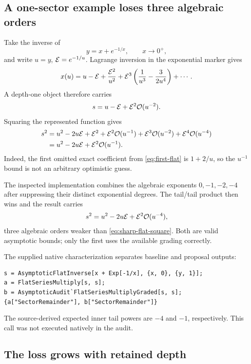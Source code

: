 \subsection{A one-sector example loses three algebraic orders}

Take the inverse of
\[
 y=x+e^{-1/x},\qquad x\to0^+,
\]
and write $u=y$, $\mathcal{E}=e^{-1/u}$. Lagrange inversion in the exponential marker gives
\begin{equation}\label{eq:first-flat}
 x(u)=u-\mathcal{E}+\frac{\mathcal{E}^2}{u^2}
       +\mathcal{E}^3\left(\frac1{u^3}-\frac{3}{2u^4}\right)+\cdots.
\end{equation}
A depth-one object therefore carries
\begin{equation}
 s=u-\mathcal{E}+\mathcal{E}^2\mathcal{O}(u^{-2}).
\end{equation}
Squaring the represented function gives
\begin{align}
 s^2={}&u^2-2u\mathcal{E}+\mathcal{E}^2
     +\mathcal{E}^2\mathcal{O}(u^{-1})
     +\mathcal{E}^3\mathcal{O}(u^{-2})
     +\mathcal{E}^4\mathcal{O}(u^{-4})\\
   ={}&u^2-2u\mathcal{E}+\mathcal{E}^2\mathcal{O}(u^{-1}).\label{eq:sharp-flat-square}
\end{align}
Indeed, the first omitted exact coefficient from \eqref{eq:first-flat} is $1+2/u$, so the $u^{-1}$ bound is not an arbitrary optimistic guess.

The inspected implementation combines the algebraic exponents $0,-1,-2,-4$ after suppressing their distinct exponential degrees. The tail/tail product then wins and the result carries
\begin{equation}\label{eq:weak-flat-square}
 s^2=u^2-2u\mathcal{E}+\mathcal{E}^2\mathcal{O}(u^{-4}),
\end{equation}
three algebraic orders weaker than \eqref{eq:sharp-flat-square}. Both are valid asymptotic bounds; only the first uses the available grading correctly.

The supplied native characterization separates baseline and proposal outputs:
\begin{lstlisting}
s = AsymptoticFlatInverse[x + Exp[-1/x], {x, 0}, {y, 1}];
a = FlatSeriesMultiply[s, s];
b = AsymptoticAudit`FlatSeriesMultiplyGraded[s, s];
{a["SectorRemainder"], b["SectorRemainder"]}
\end{lstlisting}
The source-derived expected inner tail powers are $-4$ and $-1$, respectively. This call was not executed natively in the audit.

\subsection{The loss grows with retained depth}

